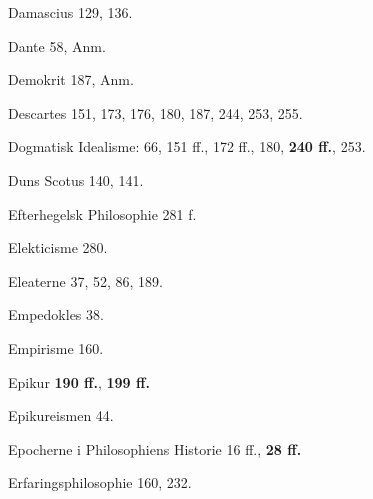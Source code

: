 \begin{list}{}
\vspace{0.5\baselineskip}
\item Damascius 129, 136.
\item Dante 58, Anm.
\item Demokrit 187, Anm.
\item Descartes 151, 173, 176, 180, 187, 244, 253, 255.
\item Dogmatisk Idealisme: 66, 151 ff., 172 ff., 180, \textbf{240 ff.}, 253.
\item Duns Scotus 140, 141.

\vspace{0.5\baselineskip}
\item Efterhegelsk Philosophie 281 f.
\item Elekticisme 280.
\item Eleaterne 37, 52, 86, 189.
\item Empedokles 38.
\item Empirisme 160.
\item Epikur \textbf{190 ff.}, \textbf{199 ff.}
\item Epikureismen 44.
\item Epocherne i Philosophiens Historie 16 ff., \textbf{28 ff.}
\item Erfaringsphilosophie 160, 232.


\end{list}
